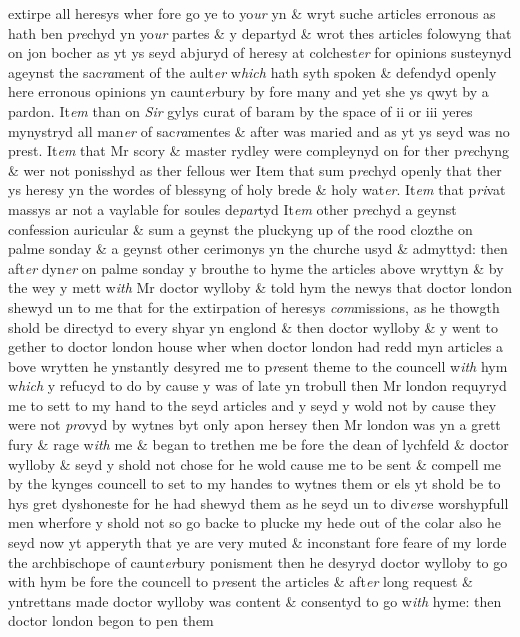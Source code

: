 \documentclass[12pt, a4paper]{book}
\begin{document}
		
		\ifthenelse{\isodd{\thepage}}
		{\reversemarginpar}
		{\normalmarginpar}
		extirpe all heresys wher fore go ye to yo\textit{ur} yn \& wryt suche articles erronous as hath ben p\textit{re}chyd yn yo\textit{ur} partes \& y departyd \& wrot thes articles folowyng that on jon bocher as yt ys seyd abjuryd of heresy at colchest\textit{er} for opinions susteynyd ageynst the sac\textit{ra}ment of the ault\textit{er} w\textit{hich} hath syth spoken \&  defendyd openly here erronous opinions yn caunt\textit{er}bury by fore many and  yet she ys qwyt by a pardon. It\textit{em} than on \textit{Sir} gylys curat of baram by the  space of ii or iii yeres mynystryd all man\textit{er} of sac\textit{ra}mentes \& after was maried
			 and as yt ys seyd was no prest. It\textit{em} that Mr scory \& master rydley were compleynyd on for ther p\textit{re}chyng \& wer not ponisshyd as ther fellous wer Item that sum p\textit{re}chyd openly that ther ys heresy yn the wordes of blessyng of  holy brede \& holy wat\textit{er}. It\textit{em} that p\textit{ri}vat massys ar not a vaylable for soules de\textit{par}tyd It\textit{em} other p\textit{re}chyd a geynst confession auricular \& sum a geynst the pluckyng up of the rood clozthe on palme sonday \& a geynst other cerimonys yn the churche usyd \& admyttyd: then aft\textit{er} dyn\textit{er} on palme sonday y brouthe to hyme the articles above wryttyn \& by the wey y mett w\textit{ith} Mr doctor wylloby \& told hym the newys that doctor london shewyd un to me that for the extirpation of heresys \textit{com}missions, as he thowgth shold be directyd to every shyar yn englond \& then doctor wylloby \& y went to gether to doctor london house wher when doctor london had redd myn articles a bove wrytten he ynstantly desyred me to p\textit{re}sent theme to the councell w\textit{ith} hym w\textit{hich} y refucyd to do by cause y was of late yn trobull then Mr london requyryd me to  sett to my hand to the seyd articles and y seyd y wold not by cause they were not \textit{pro}vyd by wytnes byt only apon hersey then Mr london was yn a  grett fury \& rage w\textit{ith} me \& began to trethen me be fore the dean of lychfeld \& doctor wylloby \& seyd y shold not chose for he wold cause me to be sent  \& compell me by the kynges councell
			 to set to my handes to wytnes them or els yt shold be to hys gret dyshoneste for he had shewyd them as he seyd un to div\textit{er}se worshypfull men wherfore y shold not so go backe to plucke my hede out of the colar also he seyd now yt apperyth that ye are very muted
			 \& inconstant fore feare of my lorde the archbischope of caunt\textit{er}bury ponisment then he desyryd doctor wylloby to go with hym be fore the councell to p\textit{re}sent the articles \& aft\textit{er} long request \& yntrettans made doctor wylloby was content \& consentyd to go w\textit{ith} hyme: then doctor london begon
			 to pen them
 	
\end{document}
